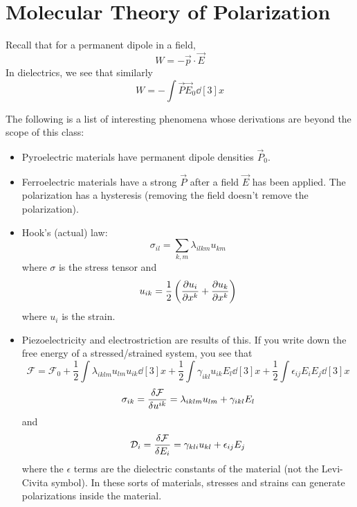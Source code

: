 \documentclass[a4paper,twoside,master.tex]{subfiles}
\begin{document}
\section{Molecular Theory of Polarization}
\label{sec:molecular_theory_of_polarization}
Recall that for a permanent dipole in a field,
\begin{equation}
    W = - \vec{p} \cdot \vec{E}
\end{equation}
In dielectrics, we see that similarly
\begin{equation}
    W = - \int \vec{P} \vec{E}_0 \dd[3]{x}
\end{equation}


The following is a list of interesting phenomena whose derivations are beyond the scope of this class:
\begin{itemize}
    \item Pyroelectric materials have permanent dipole densities $ \vec{P}_0 $.
    \item Ferroelectric materials have a  strong $ \vec{P} $  after a field $ \vec{E} $ has been applied. The polarization has a hysteresis (removing the field doesn't remove the polarization).
    \item Hook's (actual) law:
        \begin{equation}
            \sigma_{il} = \sum_{k,m} \lambda_{ilkm} u_{km}
        \end{equation}
        where $ \sigma $ is the stress tensor and
        \begin{equation}
            u_{ik} = \frac{1}{2} \left( \pdv{u_i}{x^k} + \pdv{u_k}{x^k} \right)
        \end{equation}
        where $ u_i $ is the strain.
    \item Piezoelectricity and electrostriction are results of this. If you write down the free energy of a stressed/strained system, you see that
        \begin{equation}
            \mathcal{F} = \mathcal{F}_0 + \frac{1}{2} \int \lambda_{iklm} u_{lm}  u_{ik} \dd[3]{x} + \frac{1}{2} \int \gamma_{ikl} u_{ik} E_l \dd[3]{x} + \frac{1}{2} \int \epsilon_{ij} E_i E_j \dd[3]{x}
        \end{equation}
        \begin{equation}
            \sigma_{ik} = \fdv{\mathcal{F}}{u^{ik}} = \lambda_{iklm} u_{lm} + \gamma_{ikl} E_l
        \end{equation}
        and
        \begin{equation}
            \mathcal{D}_i = \fdv{\mathcal{F}}{E_i} = \gamma_{kli} u_{kl} + \epsilon_{ij} E_j
        \end{equation}
        where the $ \epsilon $ terms are the dielectric constants of the material (not the Levi-Civita symbol). In these sorts of materials, stresses and strains can generate polarizations inside the material.
\end{itemize}
\end{document}
